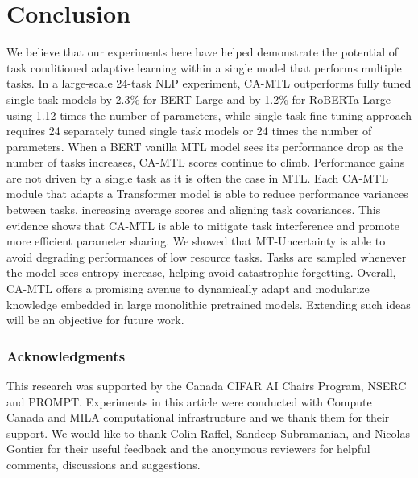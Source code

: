 \documentclass{article} \usepackage{iclr2021_conference,times}
\begin{document}
\vspace{-.15cm}
\section{Conclusion}
We believe that our experiments here have helped demonstrate the potential of task conditioned adaptive learning within a single model that performs multiple tasks.
In a large-scale 24-task NLP experiment, CA-MTL outperforms fully tuned single task models by 2.3\% for BERT Large and by 1.2\% for RoBERTa Large using 1.12 times the number of parameters, while single task fine-tuning approach requires 24 separately tuned single task models or 24 times the number of parameters. When a BERT vanilla MTL model sees its performance drop as the number of tasks increases, CA-MTL scores continue to climb. Performance gains are not driven by a single task as it is often the case in MTL. Each CA-MTL module that adapts a Transformer model is able to reduce performance variances between tasks, increasing average scores and aligning task covariances. This evidence shows that CA-MTL is able to mitigate task interference and promote more efficient parameter sharing. We showed that MT-Uncertainty is able to avoid degrading performances of low resource tasks. Tasks are sampled whenever the model sees entropy increase, helping avoid catastrophic forgetting. Overall, CA-MTL offers a promising avenue to dynamically adapt and modularize knowledge embedded in large monolithic pretrained models. Extending such ideas will be an objective for future work. 














\clearpage

\subsubsection*{Acknowledgments}
This research was supported by the Canada CIFAR AI Chairs Program, NSERC and PROMPT. Experiments in this article were conducted with Compute Canada and MILA computational infrastructure and we thank them for their support. We would like to thank Colin Raffel, Sandeep Subramanian, and Nicolas Gontier for their useful feedback and the anonymous reviewers for helpful comments, discussions and suggestions. 




\end{document}
